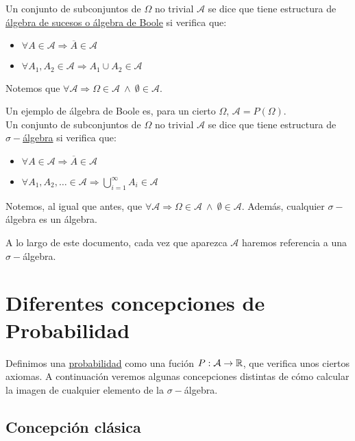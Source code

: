 Un conjunto de subconjuntos de $\Omega$ no trivial $\mathcal{A}$ se dice que tiene estructura de
\underline{álgebra de sucesos o álgebra de Boole} si verifica que:
\begin{itemize}
  \item $\forall A \in \mathcal{A} \Rightarrow \overline{A} \in \mathcal{A}$
  \item $\forall A_1, A_2 \in \mathcal{A} \Rightarrow A_1 \cup A_2 \in \mathcal{A}$
\end{itemize}

Notemos que $\forall \mathcal{A} \Rightarrow \Omega \in \mathcal{A} \ \land \ \emptyset \in \mathcal{A}$.

Un ejemplo de álgebra de Boole es, para un cierto $\Omega$, $\mathcal{A} = P(\Omega)$.\\

Un conjunto de subconjuntos de $\Omega$ no trivial $\mathcal{A}$ se dice que tiene estructura de
\underline{$\sigma-$álgebra} si verifica que:
\begin{itemize}
  \item $\forall A \in \mathcal{A} \Rightarrow \overline{A} \in \mathcal{A}$
  \item $\forall A_1, A_2, \ldots \in \mathcal{A} \Rightarrow \bigcup\limits_{i=1}^\infty A_i \in \mathcal{A}$
\end{itemize}

Notemos, al igual que antes, que $\forall \mathcal{A} \Rightarrow \Omega \in \mathcal{A} \ \land \ \emptyset \in \mathcal{A}$. Además, cualquier $\sigma-$álgebra es un álgebra.

\begin{notacion}
  A lo largo de este documento, cada vez que aparezca $\mathcal{A}$ haremos referencia a una $\sigma-$álgebra.
\end{notacion}

\section{Diferentes concepciones de Probabilidad}

Definimos una \underline{probabilidad} como una fución $P: \mathcal{A} \rightarrow \mathbb R$, que verifica
unos ciertos axiomas. A continuación veremos algunas concepciones distintas de cómo calcular la imagen
de cualquier elemento de la $\sigma-$álgebra.

\subsection{Concepción clásica}

